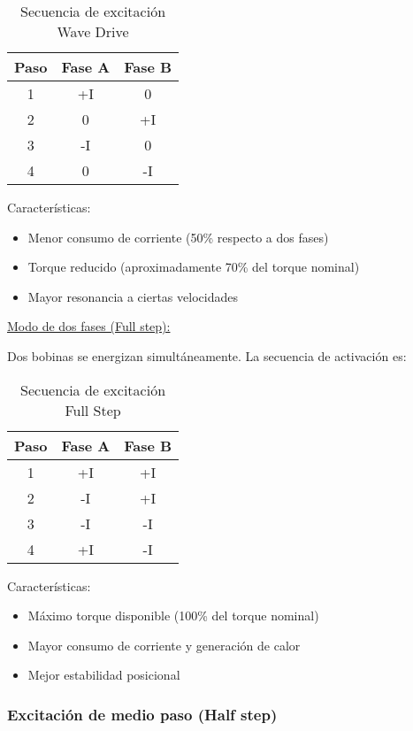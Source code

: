 \begin{table}[ht]
\centering
\begin{tabular}{|c|c|c|}
\hline
\textbf{Paso} & \textbf{Fase A} & \textbf{Fase B} \\
\hline
1 & +I & 0 \\
2 & 0 & +I \\
3 & -I & 0 \\
4 & 0 & -I \\
\hline
\end{tabular}
\caption{Secuencia de excitación Wave Drive}
\end{table}

Características:
\begin{itemize}
    \item Menor consumo de corriente (50\% respecto a dos fases)
    \item Torque reducido (aproximadamente 70\% del torque nominal)
    \item Mayor resonancia a ciertas velocidades
\end{itemize}

\underline{Modo de dos fases (Full step):}

Dos bobinas se energizan simultáneamente. La secuencia de activación es:

\begin{table}[ht]
\centering
\begin{tabular}{|c|c|c|}
\hline
\textbf{Paso} & \textbf{Fase A} & \textbf{Fase B} \\
\hline
1 & +I & +I \\
2 & -I & +I \\
3 & -I & -I \\
4 & +I & -I \\
\hline
\end{tabular}
\caption{Secuencia de excitación Full Step}
\end{table}

Características:
\begin{itemize}
    \item Máximo torque disponible (100\% del torque nominal)
    \item Mayor consumo de corriente y generación de calor
    \item Mejor estabilidad posicional
\end{itemize}

\subsubsection{Excitación de medio paso (Half step)}

